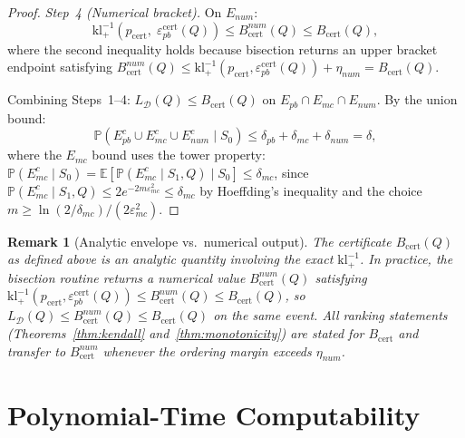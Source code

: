 \documentclass[11pt,a4paper]{article}
\newtheorem{remark}[theorem]{Remark}
\newcommand{\kl}{\mathrm{kl}}
\newcommand{\cD}{\mathcal{D}}
\newcommand{\E}{\mathbb{E}}
\newcommand{\Prob}{\mathbb{P}}
\newcommand{\klinv}{\kl^{-1}_+}
\begin{document}
\begin{proof}
\emph{Step~4 (Numerical bracket).} On $E_{num}$:
\[
\klinv\!\left(p_{\mathrm{cert}},\; \varepsilon_{pb}^{\mathrm{cert}}(Q)\right) \le B_{\mathrm{cert}}^{num}(Q) \le B_{\mathrm{cert}}(Q),
\]
where the second inequality holds because bisection returns an upper bracket endpoint satisfying $B_{\mathrm{cert}}^{num}(Q) \le \klinv(p_{\mathrm{cert}}, \varepsilon_{pb}^{\mathrm{cert}}(Q)) + \eta_{num} = B_{\mathrm{cert}}(Q)$.

Combining Steps~1--4: $L_\cD(Q) \le B_{\mathrm{cert}}(Q)$ on $E_{pb} \cap E_{mc} \cap E_{num}$. By the union bound:
\[
\Prob(E_{pb}^c \cup E_{mc}^c \cup E_{num}^c \mid S_0) \le \delta_{pb} + \delta_{mc} + \delta_{num} = \delta,
\]
where the $E_{mc}$ bound uses the tower property: $\Prob(E_{mc}^c \mid S_0) = \E[\Prob(E_{mc}^c \mid S_1, Q) \mid S_0] \le \delta_{mc}$, since $\Prob(E_{mc}^c \mid S_1, Q) \le 2e^{-2m\varepsilon_{mc}^2} \le \delta_{mc}$ by Hoeffding's inequality and the choice $m \ge \ln(2/\delta_{mc})/(2\varepsilon_{mc}^2)$.
\end{proof}

\begin{remark}[Analytic envelope vs.\ numerical output]
\label{rem:numerical}
The certificate $B_{\mathrm{cert}}(Q)$ as defined above is an analytic quantity involving the exact $\klinv$. In practice, the bisection routine returns a numerical value $B_{\mathrm{cert}}^{num}(Q)$ satisfying $\klinv(p_{\mathrm{cert}}, \varepsilon_{pb}^{\mathrm{cert}}(Q)) \le B_{\mathrm{cert}}^{num}(Q) \le B_{\mathrm{cert}}(Q)$, so $L_\cD(Q) \le B_{\mathrm{cert}}^{num}(Q) \le B_{\mathrm{cert}}(Q)$ on the same event. All ranking statements (Theorems~\ref{thm:kendall} and~\ref{thm:monotonicity}) are stated for $B_{\mathrm{cert}}$ and transfer to $B_{\mathrm{cert}}^{num}$ whenever the ordering margin exceeds $\eta_{num}$.
\end{remark}

\section{Polynomial-Time Computability}
\end{document}
